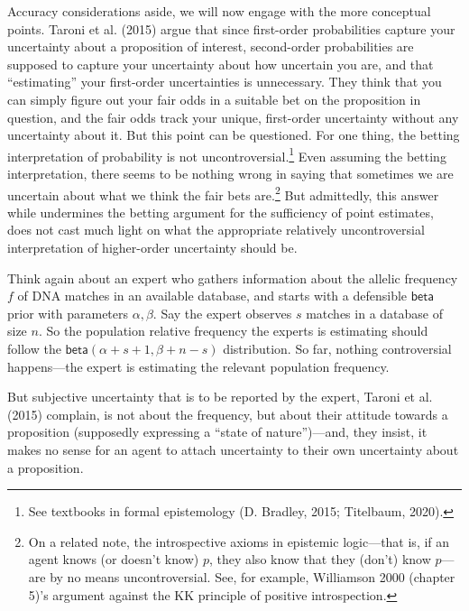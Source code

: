 \documentclass[
  10pt,
  dvipsnames,enabledeprecatedfontcommands]{scrartcl}
\newcommand{\s}[1]{\mbox{$\mathsf{#1}$}}
\begin{document}
Accuracy considerations aside, we will now engage with the more
conceptual points. Taroni et al. (2015) argue that since first-order
probabilities capture your uncertainty about a proposition of interest,
second-order probabilities are supposed to capture your uncertainty
about how uncertain you are, and that ``estimating'' your first-order
uncertainties is unnecessary. They think that you can simply figure out
your fair odds in a suitable bet on the proposition in question, and the
fair odds track your unique, first-order uncertainty without any
uncertainty about it. But this point can be questioned. For one thing,
the betting interpretation of probability is not
uncontroversial.\footnote{See textbooks in formal epistemology (D.
  Bradley, 2015; Titelbaum, 2020).} Even assuming the betting
interpretation, there seems to be nothing wrong in saying that sometimes
we are uncertain about what we think the
fair bets are.\footnote{On a related note, the introspective axioms in
  epistemic logic---that is, if an agent knows (or doesn't know) \(p\),
  they also know that they (don't) know \(p\)---are by no means
  uncontroversial. See, for example, Williamson 2000 (chapter 5)'s
  argument against the KK principle of positive introspection.} But
admittedly, this answer while undermines the betting argument for the
sufficiency of point estimates, does not cast much light on what the
appropriate relatively uncontroversial interpretation of higher-order
uncertainty should be.

Think again about an expert who gathers information about the allelic
frequency \(f\) of DNA matches in an available database, and starts with
a defensible \s{beta} prior with parameters \(\alpha, \beta\). Say the
expert observes \(s\) matches in a database of size \(n\). So the
population relative frequency the experts is estimating should follow
the \(\s{beta}(\alpha + s + 1 ,\beta + n - s)\) distribution. So far,
nothing controversial happens---the expert is estimating the relevant
population frequency.

But subjective uncertainty that is to be reported by the expert, Taroni
et al. (2015) complain, is not about the frequency, but about their
attitude towards a proposition (supposedly expressing a ``state of
nature'')---and, they insist, it makes no sense for an agent to attach
uncertainty to their own uncertainty about a proposition.
\end{document}
